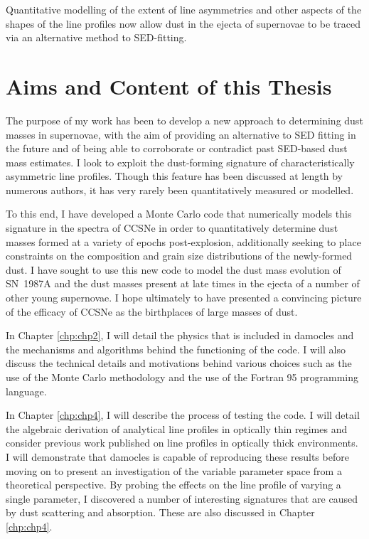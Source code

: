 Quantitative modelling of the extent of line asymmetries and other aspects of the shapes of the line profiles now allow dust in the ejecta of supernovae to be traced via an alternative method to SED-fitting.  

\section{Aims and Content of this Thesis}
The purpose of my work has been to develop a new approach to determining dust masses in supernovae, with the aim of providing an alternative to SED fitting in the future and of being able to corroborate or contradict past SED-based dust mass estimates.  I look to exploit the dust-forming signature of characteristically asymmetric line profiles.  Though this feature has been discussed at length by numerous authors, it has very rarely been quantitatively measured or modelled.

To this end, I have developed a Monte Carlo  code that numerically models this signature in the spectra of CCSNe in order to quantitatively determine dust masses formed at a variety of epochs post-explosion, additionally seeking to place constraints on the composition and grain size distributions of the newly-formed dust. I have sought to use this new code to model the dust mass evolution  of SN~1987A and the dust masses present at late times in the ejecta of a number of other young supernovae.  I hope ultimately to have presented a convincing picture of the efficacy of CCSNe as the birthplaces of large masses of dust.

In Chapter \ref{chp:chp2}, I will detail the physics that is included in {\sc damocles} and the mechanisms and algorithms behind the functioning of the code.  I will also discuss the technical details and motivations behind various choices such as the use of the Monte Carlo methodology and the use of the Fortran 95 programming language.  

In Chapter \ref{chp:chp4}, I will describe the process of testing the code.  I will detail the algebraic derivation of analytical line profiles in optically thin regimes and consider previous work published on line profiles in optically thick environments.  I will demonstrate that {\sc damocles} is capable of reproducing these results before moving on to present an investigation of the variable parameter space from a theoretical perspective.  By probing the effects on the line profile of varying a single parameter, I discovered a number of interesting signatures that are caused by dust scattering and absorption.  These are also discussed in Chapter \ref{chp:chp4}.  

